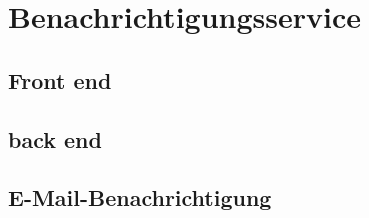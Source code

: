 
\section{Benachrichtigungsservice}

\subsection{Front end}

\subsection{back end}

\subsection{E-Mail-Benachrichtigung}
